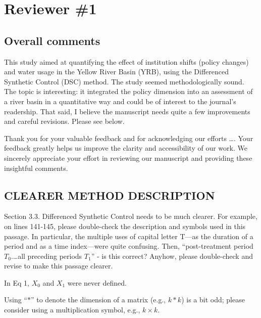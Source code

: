 \section{Reviewer \#1}\label{reviewer_1}

\subsection*{Overall comments}

\RC{} This study aimed at quantifying the effect of institution shifts (policy changes) and water usage in the Yellow River Basin (YRB), using the Differenced Synthetic Control (DSC) method. The study seemed methodologically sound. The topic is interesting: it integrated the policy dimension into an assessment of a river basin in a quantitative way and could be of interest to the journal's readership. That said, I believe the manuscript needs quite a few improvements and careful revisions. Please see below.

\AR{} Thank you for your valuable feedback and for acknowledging our efforts \dots. Your feedback greatly helps us improve the clarity and accessibility of our work. We sincerely appreciate your effort in reviewing our manuscript and providing these insightful comments.

\subsection{CLEARER METHOD DESCRIPTION}\label{sec:1-1}

\RC{} Section 3.3. Differenced Synthetic Control needs to be much clearer. For example, on lines 141-145, please double-check the description and symbols used in this passage. In particular, the multiple uses of capital letter T—as the duration of a period and as a time index—were quite confusing. Then, ``post-treatment period $T_0$.\ldots all preceding periods $T_1$'' - is this correct? Anyhow, please double-check and revise to make this passage clearer.

\RC{} In Eq 1, $X_0$ and $X_1$ were never defined.

\RC{} Using ``$*$'' to denote the dimension of a matrix (e.g., $k*k$) is a bit odd; please consider using a multiplication symbol, e.g., $k \times k$.

